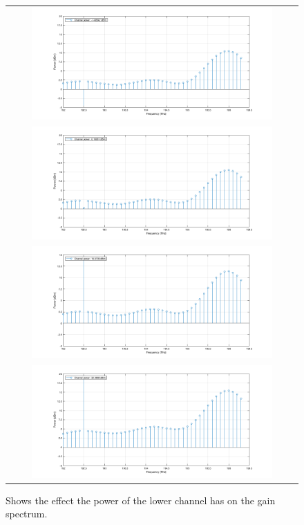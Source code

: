 \renewcommand{\arraystretch}{0.5}
\begin{figure}
    \centering
    \caption{Shows the effect the power of the lower channel has on the gain spectrum.}
    \begin{tabular}{c}
        \includegraphics[width=0.85\textwidth]{images/technical_work/section_1_characterisation/figures/1.png} \\
        \includegraphics[width=0.85\textwidth]{images/technical_work/section_1_characterisation/figures/2.png} \\
        \includegraphics[width=0.85\textwidth]{images/technical_work/section_1_characterisation/figures/3.png} \\
        \includegraphics[width=0.85\textwidth]{images/technical_work/section_1_characterisation/figures/4.png} \\
    \end{tabular}
    \label{fig:tw_amp_char_lc}
\end{figure}


